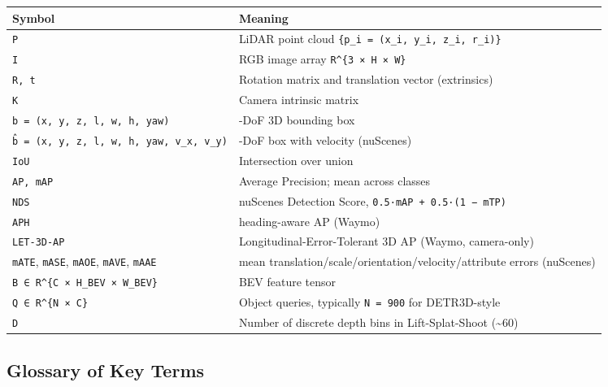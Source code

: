 {\def\LTcaptype{none} %
\begin{longtable}[]{@{}
  >{\raggedright\arraybackslash}p{}
  >{\raggedright\arraybackslash}p{}@{}}
\toprule\noalign{}
\begin{minipage}[b]{\linewidth}\raggedright
Symbol
\end{minipage} & \begin{minipage}[b]{\linewidth}\raggedright
Meaning
\end{minipage} \\
\midrule\noalign{}
\endhead
\bottomrule\noalign{}
\endlastfoot
\texttt{P} & LiDAR point cloud \texttt{\{p\_i\ =\ (x\_i,\ y\_i,\ z\_i,\ r\_i)\}} \\
\texttt{I} & RGB image array \texttt{R\^{}\{3\ ×\ H\ ×\ W\}} \\
\texttt{R,\ t} & Rotation matrix and translation vector (extrinsics) \\
\texttt{K} & Camera intrinsic matrix \\
\texttt{b\ =\ (x,\ y,\ z,\ l,\ w,\ h,\ yaw)} & 7-DoF 3D bounding box \\
\texttt{b̂\ =\ (x,\ y,\ z,\ l,\ w,\ h,\ yaw,\ v\_x,\ v\_y)} & 9-DoF box with velocity (nuScenes) \\
\texttt{IoU} & Intersection over union \\
\texttt{AP,\ mAP} & Average Precision; mean across classes \\
\texttt{NDS} & nuScenes Detection Score, \texttt{0.5·mAP\ +\ 0.5·(1\ −\ mTP)} \\
\texttt{APH} & heading-aware AP (Waymo) \\
\texttt{LET-3D-AP} & Longitudinal-Error-Tolerant 3D AP (Waymo, camera-only) \\
\texttt{mATE}, \texttt{mASE}, \texttt{mAOE}, \texttt{mAVE}, \texttt{mAAE} & mean translation/scale/orientation/velocity/attribute errors (nuScenes) \\
\texttt{B\ ∈\ R\^{}\{C\ ×\ H\_BEV\ ×\ W\_BEV\}} & BEV feature tensor \\
\texttt{Q\ ∈\ R\^{}\{N\ ×\ C\}} & Object queries, typically \texttt{N\ =\ 900} for DETR3D-style \\
\texttt{D} & Number of discrete depth bins in Lift-Splat-Shoot (\textasciitilde60) \\
\end{longtable}
}

\subsection{Glossary of Key Terms}\label{glossary-of-key-terms}

